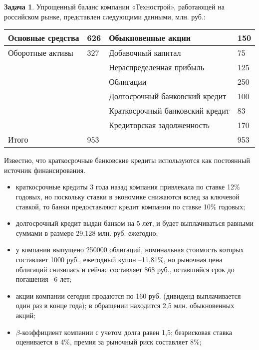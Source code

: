 \documentclass[a4paper, 14pt]{article}
\theoremstyle{plain} %
\theoremstyle{definition} %
\newtheorem{problem}{Задача}[subsection]
\theoremstyle{remark} %
\begin{document}
\begin{problem}
	Упрощенный баланс компании «Технострой», работающей на российском рынке, представлен следующими данными, млн. руб.:

	\begin{center}
	\centering
	\begin{tabular}{|l|l|l|l|}
	\hline
	Основные средства & 626 & Обыкновенные акции              & 150  \\
	\hline
	Оборотные активы  & 327 & Добавочный капитал              & 75   \\
	\hline
	                  &     & Нераспределенная прибыль        & 125  \\
	\hline
	                  &     & Облигации                       & 250  \\
	\hline
	                  &     & Долгосрочный банковский кредит  & 100  \\
	\hline
	                  &     & Краткосрочный банковский кредит & 83   \\
	\hline
	                  &     & Кредиторская задолженность      & 170  \\
	\hline
	Итого             & 953 &                                 & 953  \\
	\hline
	\end{tabular}
\end{center}
Известно, что краткосрочные банковские кредиты используются как постоянный источник финансирования.
\begin{itemize}
	\item краткосрочные кредиты 3 года назад компания привлекала по ставке 12\% годовых, но поскольку ставки в экономике снижаются вслед за ключевой ставкой, то банки предоставляют кредит компании по ставке 10\% годовых;
	\item долгосрочный кредит выдан банком на 5 лет, и будет выплачиваться равными суммами в размере 29,128 млн. руб. ежегодно;
	\item у  компании  выпущено  250000  облигаций,  номинальная  стоимость  которых составляет 1000 руб., ежегодный купон –11,81\%, но рыночная цена облигаций снизилась и сейчас составляет 868 руб., оставшийся срок до погашения –6 лет;
	\item акции компании сегодня продаются по 160 руб. (дивиденд выплачивается один раз в конце года); в обращении находится 2,5 млн. обыкновенных акций;
	\item $\beta$-коэффициент компании с учетом долга равен 1,5; безрисковая ставка оценивается в 4\%, премия за рыночный риск составляет 8\%;

\end{itemize}
\end{problem}
\end{document}
